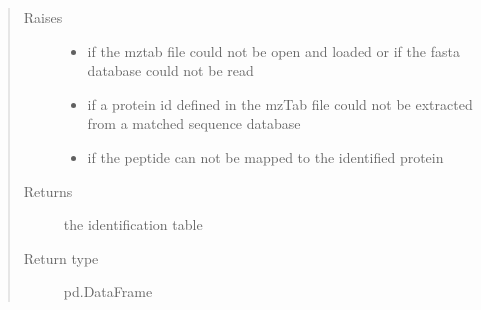 \documentclass[letterpaper,10pt,english]{sphinxmanual}
\begin{document}
\begin{fulllineitems}
\begin{quote}
\begin{description}
\item[{Raises}] \leavevmode\begin{itemize}
\item {} 
 \textendash{} if the mztab file could not be open and loaded or if the fasta database could not be read

\item {} 
 \textendash{} if a protein id defined in the mzTab file could not be extracted from a matched sequence database

\item {} 
 \textendash{} if the peptide can not be mapped to the identified protein

\end{itemize}

\item[{Returns}] \leavevmode
the identification table

\item[{Return type}] \leavevmode
pd.DataFrame

\end{description}\end{quote}

\end{fulllineitems}

\end{document}
